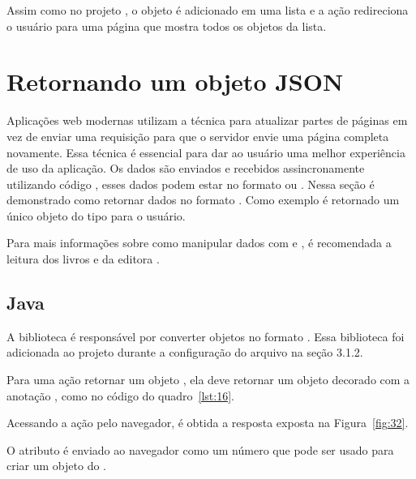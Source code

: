
Assim como no projeto , o objeto  é adicionado em uma lista e a ação redireciona o usuário para uma página que mostra todos os objetos da lista.

\section{Retornando um objeto JSON}

Aplicações web modernas utilizam a técnica  para atualizar partes de páginas em vez de enviar uma requisição para que o servidor envie uma página completa novamente. Essa técnica é essencial para dar ao usuário uma melhor experiência de uso da aplicação. Os dados são enviados e recebidos assincronamente utilizando código , esses dados podem estar no formato  ou . Nessa seção é demonstrado como retornar dados no formato . Como exemplo é retornado um único objeto do tipo  para o usuário.

Para mais informações sobre como manipular dados com  e , é recomendada a leitura dos livros  e  da editora .

\subsection{Java}

A biblioteca  é responsável por converter objetos  no formato . Essa biblioteca foi adicionada ao projeto durante a configuração do arquivo  na seção 3.1.2. 

Para uma ação retornar um objeto , ela deve retornar um objeto  decorado com a anotação , como no código do quadro~\ref{lst:16}.


Acessando a ação  pelo navegador, é obtida a resposta exposta na Figura~\ref{fig:32}.


O atributo  é enviado ao navegador como um número que pode ser usado para criar um objeto  do .

